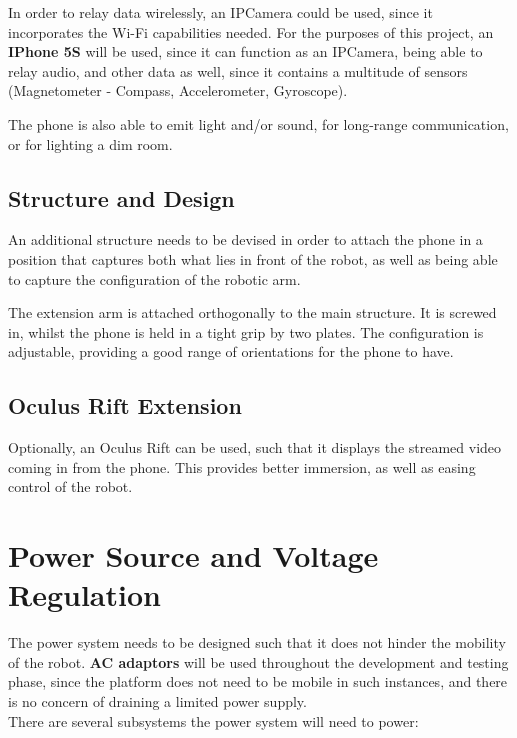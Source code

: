 \documentclass[12p,a4paper]{report}
\begin{document}
In order to relay data wirelessly, an IPCamera could be used, since it incorporates the Wi-Fi capabilities needed. For the purposes of this project, an \textbf{IPhone 5S} will be used, since it can function as an IPCamera, being able to relay audio, and other data as well, since it contains a multitude of sensors (Magnetometer - Compass, Accelerometer, Gyroscope).

The phone is also able to emit light and/or sound, for long-range communication, or for lighting a dim room.

\subsection{Structure and Design}

An additional structure needs to be devised in order to attach the phone in a position that captures both what lies in front of the robot, as well as being able to capture the  configuration of the robotic arm.

The extension arm is attached orthogonally to the main structure. It is screwed in, whilst the phone is held in a tight grip by two plates. The configuration is adjustable, providing a good range of orientations for the phone to have.

\subsection{Oculus Rift Extension}

Optionally, an Oculus Rift can be used, such that it displays the streamed video coming in from the phone. This provides better immersion, as well as easing control of the robot.

\newpage
\section{Power Source and Voltage Regulation}
The power system needs to be designed such that it does not
hinder the mobility of the robot. \textbf{AC adaptors} will be used throughout the development and testing phase, since the platform does not need to be mobile in such instances, and there is no concern of draining a limited power supply. \\

There are several subsystems the power system will need to power:
\end{document}
